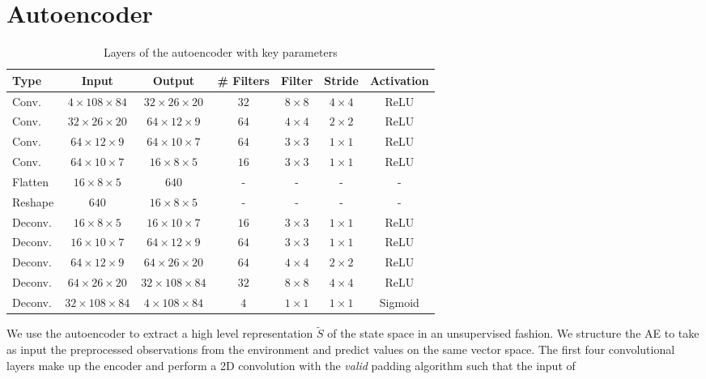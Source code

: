 \section{Autoencoder}
%
\begin{table}[h]
    \centering
    \begin{tabular}{l c c c c c c} 
	\hline
	Type & Input & Output & \# Filters & Filter & Stride & Activation \\ 
	\hline 
	Conv. & $4 \times 108 \times 84$ & $32 \times 26 \times 20$ & $32$ & $8 \times 8$ & $4 \times 4$ & ReLU \\ 
	Conv. & $32 \times 26 \times 20$ & $64 \times 12 \times 9$ & $64$ & $4 \times 4$ & $2 \times 2$ & ReLU \\ 
	Conv. & $64 \times 12 \times 9$ & $64 \times 10 \times 7$ & $64$ & $3 \times 3$ & $1 \times 1$ & ReLU \\ 
	Conv. & $64 \times 10 \times 7$ & $16 \times 8 \times 5$ & $16$ & $3 \times 3$ & $1 \times 1$ & ReLU \\ 
	Flatten	& $16 \times 8 \times 5$ & $640$ & - & - & - & - \\ 
	\hline
	Reshape & $640$ & $16 \times 8 \times 5$ & - & - & - & - \\
	Deconv. & $16 \times 8 \times 5$ & $16 \times 10 \times 7$ & $16$ & $3 \times 3$ & $1 \times 1$ & ReLU \\ 
	Deconv. & $16 \times 10 \times 7$ & $64 \times 12 \times 9$ & $64$ & $3 \times 3$ & $1 \times 1$ & ReLU \\
	Deconv. & $64 \times 12 \times 9$ & $64 \times 26 \times 20$ & $64$ & $4 \times 4$ & $2 \times 2$ & ReLU \\
	Deconv. & $64 \times 26 \times 20$ & $32 \times 108 \times 84$ & $32$ & $8 \times 8$ & $4 \times 4$ & ReLU \\
	Deconv. & $32 \times 108 \times 84$ & $4 \times 108 \times 84$ & $4$ & $1 \times 1$ & $1 \times 1$ & Sigmoid \\
	\hline
    \end{tabular}
    \caption{Layers of the autoencoder with key parameters}
    \label{t:AE_structure}
\end{table}
%
We use the autoencoder to extract a high level representation $\tilde{S}$ of the
state space in an unsupervised fashion.
We structure the AE to take as input the preprocessed observations from the
environment and predict values on the same vector space.
The first four convolutional layers make up the encoder and perform a 2D 
convolution with the \textit{valid} padding algorithm such that the input of 

